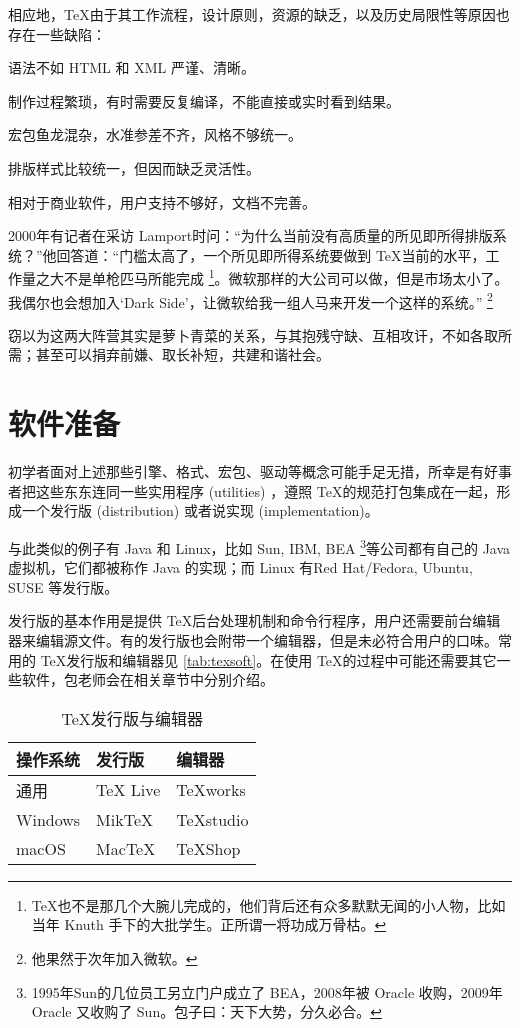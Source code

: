 相应地，\TeX 由于其工作流程，设计原则，资源的缺乏，以及历史局限性等原因也存在一些缺陷：
\begin{compactitem}
   \item 语法不如 HTML 和 XML 严谨、清晰。
   \item 制作过程繁琐，有时需要反复编译，不能直接或实时看到结果。
   \item 宏包鱼龙混杂，水准参差不齐，风格不够统一。
   \item 排版样式比较统一，但因而缺乏灵活性。
   \item 相对于商业软件，用户支持不够好，文档不完善。
\end{compactitem}

2000年有记者在采访 Lamport\indexLamport{}时问：“为什么当前没有高质量的所见即所得排版系统？”他回答道：“门槛太高了，一个所见即所得系统要做到 \TeX 当前的水平，工作量之大不是单枪匹马所能完成 \footnote{\TeX 也不是那几个大腕儿完成的，他们背后还有众多默默无闻的小人物，比如当年 Knuth 手下的大批学生。正所谓一将功成万骨枯。}。微软那样的大公司可以做，但是市场太小了。我偶尔也会想加入‘Dark Side’，让微软给我一组人马来开发一个这样的系统。” \footnote{他果然于次年加入微软。}

窃以为这两大阵营其实是萝卜青菜的关系，与其抱残守缺、互相攻讦，不如各取所需；甚至可以捐弃前嫌、取长补短，共建和谐社会。

\section{软件准备}

初学者面对上述那些引擎、格式、宏包、驱动等概念可能手足无措，所幸是有好事者把这些东东连同一些实用程序 (utilities) ，遵照 \TeX 的规范打包集成在一起，形成一个发行版 (distribution) 或者说实现 (implementation)。

与此类似的例子有 Java 和 Linux，比如 Sun, IBM, BEA \footnote{1995年Sun的几位员工另立门户成立了 BEA，2008年被 Oracle 收购，2009年 Oracle 又收购了 Sun。包子曰：天下大势，分久必合。}等公司都有自己的 Java 虚拟机，它们都被称作 Java 的实现；而 Linux 有Red Hat/Fedora, Ubuntu, SUSE 等发行版。

发行版的基本作用是提供 \TeX 后台处理机制和命令行程序，用户还需要前台编辑器来编辑源文件。有的发行版也会附带一个编辑器，但是未必符合用户的口味。常用的 \TeX 发行版和编辑器见 \autoref{tab:texsoft}。在使用 \TeX 的过程中可能还需要其它一些软件，包老师会在相关章节中分别介绍。

\begin{table}[htbp]
\caption{\TeX 发行版与编辑器}
\label{tab:texsoft}
\centering
\begin{tabular}{lll}
   \toprule
    操作系统 & 发行版 & 编辑器 \\
   \midrule
    通用        & TeX Live  & TeXworks \\
    Windows     & MikTeX    & TeXstudio \\
    macOS       & MacTeX    & TeXShop \\

   \bottomrule
\end{tabular}
\end{table}

